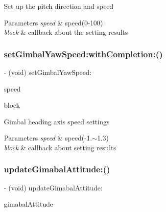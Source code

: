 Set up the pitch direction and speed


\begin{DoxyParams}{Parameters}
{\em speed} & speed(0-\/100) \\
\hline
{\em block} & callback about the setting results \\
\hline
\end{DoxyParams}
\mbox{\label{interface_p_v_gimabal_aaaad76567d8ba219e2810ac929d1730b}} 
\subsubsection{\texorpdfstring{set\+Gimbal\+Yaw\+Speed\+:with\+Completion\+:()}{setGimbalYawSpeed:withCompletion:()}}
{\footnotesize\ttfamily -\/ (void) set\+Gimbal\+Yaw\+Speed\+: \begin{DoxyParamCaption}\item[{(float)}]{speed }\item[{withCompletion:(P\+V\+Completion\+Block)}]{block }\end{DoxyParamCaption}}

Gimbal heading axis speed settings


\begin{DoxyParams}{Parameters}
{\em speed} & speed(-\/1.$\sim$1.3) \\
\hline
{\em block} & callback about setting results \\
\hline
\end{DoxyParams}
\mbox{\label{interface_p_v_gimabal_a4936daad2a491d8244a8645a33bdce84}} 
\subsubsection{\texorpdfstring{update\+Gimabal\+Attitude\+:()}{updateGimabalAttitude:()}}
{\footnotesize\ttfamily -\/ (void) update\+Gimabal\+Attitude\+: \begin{DoxyParamCaption}\item[{(\hyperlink{struct_p_v_gimabal_attitude}{P\+V\+Gimabal\+Attitude})}]{gimabal\+Attitude }\end{DoxyParamCaption}}

